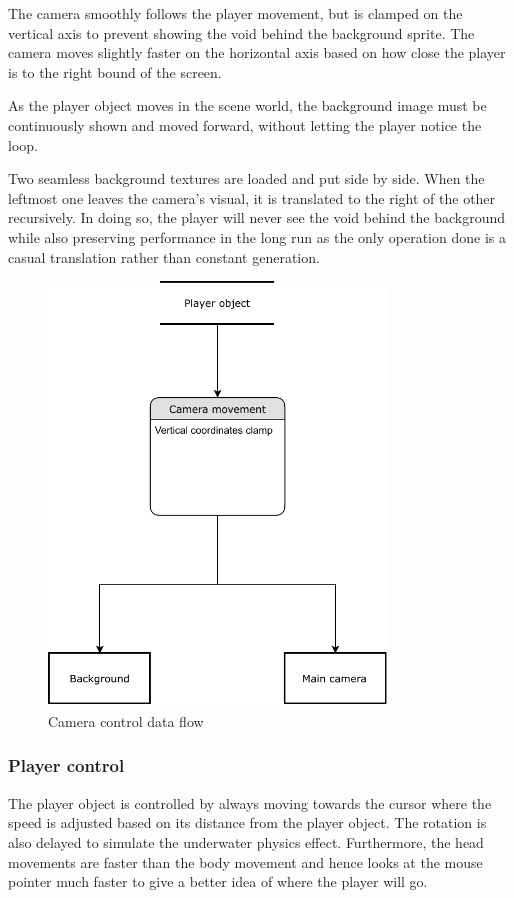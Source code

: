 \documentclass[11pt]{article}
\begin{document}
The camera smoothly follows the player movement, but is clamped on the vertical axis to prevent showing the void behind the background sprite. The camera moves slightly faster on the horizontal axis based on how close the player is to the right bound of the screen.

As the player object moves in the scene world, the background image must be continuously shown and moved forward, without letting the player notice the loop.

Two seamless background textures are loaded and put side by side. When the leftmost one leaves the camera’s visual, it is translated to the right of the other recursively. In doing so, the player will never see the void behind the background while also preserving performance in the long run as the only operation done is a casual translation rather than constant generation.

\begin{figure}[H]
  \centering
  \includegraphics[width=0.8\textwidth]{figures/camera_controller}
  \caption{Camera control data flow}
\end{figure}

\subsubsection{Player control}
The player object is controlled by always moving towards the cursor where the speed is adjusted based on its distance from the player object. The rotation is also delayed to simulate the underwater physics effect. Furthermore, the head movements are faster than the body movement and hence looks at the mouse pointer much faster to give a better idea of where the player will go.
\end{document}
